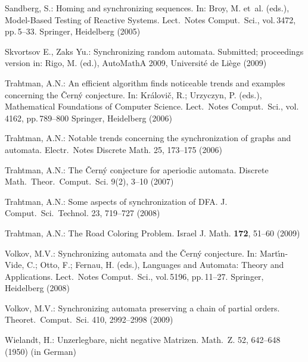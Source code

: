 \documentclass[11pt]{article}
\begin{document}
\begin{thebibliography}{99}
Sandberg, S.: Homing and synchronizing sequences. In: Broy, M.
et~al. (eds.), Model-Based Testing of Reactive Systems. Lect.\
Notes Comput.\ Sci., vol.\,3472, pp.\,5--33. Springer, Heidelberg
(2005)

Skvortsov E., Zaks Yu.: Synchronizing random automata. Submitted;
proceedings version in: Rigo, M. (ed.), AutoMathA 2009, Universit\'e
de Li\`ege (2009)

Trahtman, A.N.: An efficient algorithm finds noticeable trends
and examples concerning the \v{C}ern\'y conjecture. In:
Kr\'alovi\v{c}, R.; Urzyczyn, P. (eds.), Mathematical Foundations
of Computer Science. Lect.\ Notes Comput.\ Sci., vol.\,4162, pp.\,789--800
Springer, Heidelberg (2006)

Trahtman, A.N.: Notable trends concerning the synchronization
of graphs and automata. Electr.\ Notes Discrete Math. 25, 173--175 (2006)

Trahtman, A.N.: The \v{C}ern\'y conjecture for aperiodic automata.
Discrete Math.\ Theor.\ Comput.\ Sci. 9(2), 3--10 (2007)

Trahtman, A.N.: Some aspects of synchronization of DFA. J. Comput.\ Sci.\
Technol. 23, 719--727 (2008)

Trahtman, A.N.: The Road Coloring Problem. Israel J. Math.
\textbf{172}, 51--60 (2009)

Volkov, M.V.: Synchronizing automata and the \v{C}ern\'{y}
conjecture. In: Mart\'\i{}n-Vide, C.; Otto, F.; Fernau, H. (eds.),
Languages and Automata: Theory and Applications. Lect.\ Notes
Comput.\ Sci., vol.\,5196, pp.\,11--27.  Springer, Heidelberg (2008)

\bibitem{Vo09}
Volkov, M.V.: Synchronizing automata preserving a chain of partial
orders. Theoret.\ Comput.\ Sci. 410, 2992--2998 (2009)

Wielandt, H.: Unzerlegbare, nicht negative Matrizen. Math.\ Z.
52, 642--648 (1950) (in German)
\end{thebibliography}
\end{document}
